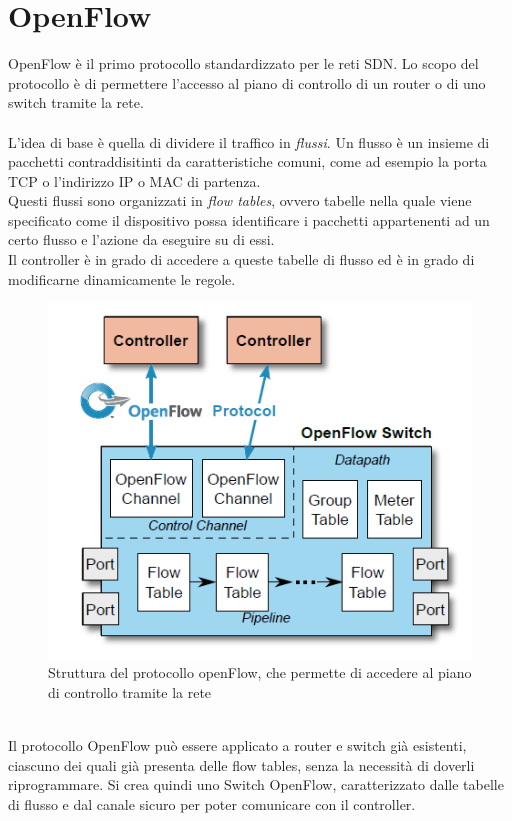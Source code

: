 \section{OpenFlow}\label{ch:2.2}
OpenFlow è il primo protocollo standardizzato per le reti SDN. Lo scopo del protocollo è di permettere l'accesso al piano di controllo di un router o di uno switch tramite la rete.\\\\
L'idea di base è quella di dividere il traffico in \textit{flussi}. Un flusso è un insieme di pacchetti contraddisitinti da caratteristiche comuni, come ad esempio la porta TCP o l'indirizzo IP o MAC di partenza.\\
Questi flussi sono organizzati in \textit{flow tables}, ovvero tabelle nella quale viene specificato come il dispositivo possa identificare i pacchetti appartenenti ad un certo flusso e l'azione da eseguire su di essi. \\
Il controller è in grado di accedere a queste tabelle di flusso ed è in grado di modificarne dinamicamente le regole.\\
\begin{figure}[h!]
	\centering
	\includegraphics[width=0.85\linewidth]{../immagini/of}
	\caption[Protocollo OpenFlow]{Struttura del protocollo openFlow, che permette di accedere al piano di controllo tramite la rete}
	\label{fig:of}
\end{figure}\\
Il protocollo OpenFlow può essere applicato a router e switch già esistenti, ciascuno dei quali già presenta delle flow tables, senza la necessità di doverli riprogrammare. Si crea quindi uno Switch OpenFlow, caratterizzato dalle tabelle di flusso e dal canale sicuro per poter comunicare con il controller.\\
